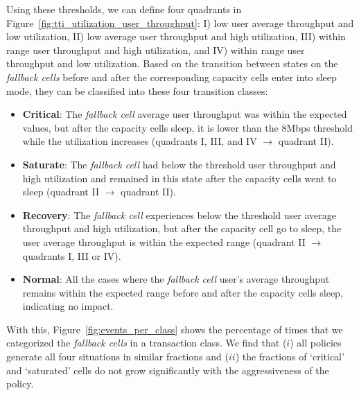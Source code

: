 Using these thresholds, we can define four quadrants in Figure~\ref{fig:tti_utilization_user_throughput}: I) low user average throughput and low utilization, II) low average user throughput and high utilization, III) within range user throughput and high utilization, and IV) within range user throughput and low utilization.
Based on the transition between states on the \textit{fallback cells} before and after the corresponding capacity cells enter into sleep mode, they can be classified into these four transition classes: 
\begin{itemize}[leftmargin=*]
    \item \textbf{Critical}: The \textit{fallback cell} average user throughput was within the expected values, but after the capacity cells sleep, it is lower than the 8Mbps threshold while the utilization increases (\ie quadrants I, III, and IV $\rightarrow$ quadrant II).
    \item \textbf{Saturate}: The \textit{fallback cell} had below the threshold user throughput and high utilization and remained in this state after the capacity cells went to sleep (\ie quadrant II $\rightarrow$ quadrant II).
    \item \textbf{Recovery}: The \textit{fallback cell} experiences below the threshold user average throughput and high utilization, but after the capacity cell go to sleep, the user average throughput is within the expected range (\ie quadrant II $\rightarrow$ quadrants I, III or IV).
    \item \textbf{Normal}: All the cases where the \textit{fallback cell} user's average throughput remains within the expected range before and after the capacity cells sleep, indicating no impact.
\end{itemize}



With this, Figure~\ref{fig:events_per_class} shows the percentage of times that we categorized the \textit{fallback cells} in a transaction class. 
We find that ($i$) all policies generate all four situations in similar fractions and ($ii$) the fractions of `critical' and `saturated' cells do not grow significantly with the aggressiveness of the policy.

        
